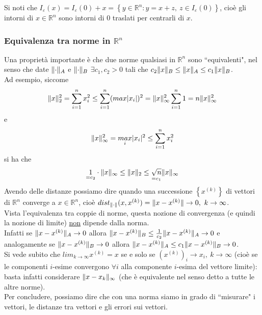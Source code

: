 \documentclass[12pt,a4paper]{article}
\DeclarePairedDelimiter{\norma}{\lVert}{\rVert}
\begin{document}
Si noti che $I_\varepsilon(x) = I_\varepsilon(0) + x = \left\{ y \in \mathbb{R}^n : y = x+z, \ z \in I_\varepsilon(0) \right\}$,
cioè gli intorni di $x \in \mathbb{R}^n$ sono intorni di 0 traslati per centrarli di $x$.

\subsubsection{Equivalenza tra norme in $\mathbb{R}^n$}
Una proprietà importante è che due norme qualsiasi in $\mathbb{R}^n$ sono ``equivalenti", nel senso che date $\norma{\cdot}_A$ e $\norma{\cdot}_B$ $\exists c_1, c_2 > 0$ tali che  $c_2\norma{x}_B \leq \norma{x}_A \leq c_1\norma{x}_B$. \\
Ad esempio, siccome 
\begin{equation*}
        \norma{x}_2^2 = \sum_{i=1}^n x_i^2 \leq \sum_{i=1}^n (max\lvert x_i \rvert)^2 = \norma{x}_\infty^2 \sum_{i=1}^n 1 = n \norma{x}_\infty^2
\end{equation*}
e
\begin{equation*}
    \norma{x}_\infty^2 = \underset{i}{max}\lvert x_i \rvert^2 \leq \sum_{i=1}^n x_i^2
\end{equation*}
si ha che 
\begin{equation*}
    \underset{=c_2}{1} \cdot \norma{x}_\infty \leq \norma{x}_2 \leq \underset{=c_1}{\sqrt{n}} \norma{x}_\infty
\end{equation*}
Avendo delle distanze possiamo dire quando una successione $\left\{ x^{(k)} \right\}$ di vettori di $\mathbb{R}^n$ converge a $x \in \mathbb{R}^n$, cioè $dist_{\norma{\cdot}}(x,x^{(k)}) = \norma{x-x^{(k)}} \rightarrow 0, \ k \rightarrow \infty$.\\
Vista l'equivalenza tra coppie di norme, questa nozione di convergenza (e quindi la nozione di limite) \uline{non} dipende dalla norma.\\
Infatti se $\norma{x-x^{(k)}}_A \rightarrow 0$ allora $\norma{x-x^{(k)}}_B \leq \frac{1}{c_2}\norma{x-x^{(k)}}_A \rightarrow 0$ e analogamente se $\norma{x-x^{(k)}}_B \rightarrow 0$ allora $\norma{x-x^{(k)}}_A \leq c_1 \norma{x-x^{(k)}}_B \rightarrow 0$. \\
Si vede subito che $lim_{k\to \infty} x^{(k)} = x$
se e solo se $(x^{(k)})_i \rightarrow x_i, \ k \to \infty$ (cioè se le componenti $i$-esime convergono $\forall i$ alla componente $i$-esima del vettore limite): basta infatti considerare $\norma{x-x_k}_\infty$ (che è equivalente nel senso detto a tutte le altre norme).\\
Per concludere, possiamo dire che con una norma siamo in grado di ``misurare" i vettori, le distanze tra vettori e gli errori sui vettori.
\end{document}
